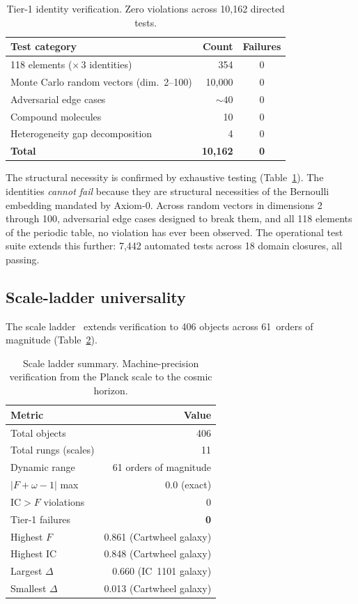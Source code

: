 \documentclass[
  aps,
  prd,
  twocolumn,
  superscriptaddress,
  nofootinbib,
  floatfix
]{revtex4-2}
\newcommand{\IC}{\mathrm{IC}}
\begin{document}
\begin{table}[t]
\caption{\label{tab:tier1-tests}Tier-1 identity verification.
Zero violations across 10{,}162 directed tests.}
\begin{ruledtabular}
\begin{tabular}{lrc}
Test category & Count & Failures \\
\midrule
118 elements ($\times\,3$ identities) & 354 & 0 \\
Monte Carlo random vectors (dim.\ 2--100) & 10{,}000 & 0 \\
Adversarial edge cases & $\sim\!40$ & 0 \\
Compound molecules & 10 & 0 \\
Heterogeneity gap decomposition & 4 & 0 \\
\midrule
\textbf{Total} & \textbf{10{,}162} & \textbf{0}
\end{tabular}
\end{ruledtabular}
\end{table}

The structural necessity is confirmed by exhaustive testing
(Table~\ref{tab:tier1-tests}).  The identities \emph{cannot fail}
because they are structural necessities of the Bernoulli embedding
mandated by Axiom-0.  Across random vectors in dimensions 2 through
100, adversarial edge cases designed to break them, and all 118
elements of the periodic table, no violation has ever been observed.
The operational test suite extends this further: 7{,}442 automated
tests across 18 domain closures, all passing.

\subsection{Scale-ladder universality}

The scale ladder~\cite{umcpmetadatarepo} extends verification to
406 objects across 61~orders of magnitude
(Table~\ref{tab:scale-ladder}).

\begin{table}[t]
\caption{\label{tab:scale-ladder}Scale ladder summary.
Machine-precision verification from the Planck scale to the cosmic
horizon.}
\begin{ruledtabular}
\begin{tabular}{lr}
Metric & Value \\
\midrule
Total objects & 406 \\
Total rungs (scales) & 11 \\
Dynamic range & 61 orders of magnitude \\
$|F + \omega - 1|$ max & $0.0$ (exact) \\
$\IC > F$ violations & 0 \\
Tier-1 failures & \textbf{0} \\
Highest $F$ & 0.861 (Cartwheel galaxy) \\
Highest $\IC$ & 0.848 (Cartwheel galaxy) \\
Largest $\Delta$ & 0.660 (IC~1101 galaxy) \\
Smallest $\Delta$ & 0.013 (Cartwheel galaxy) \\
\end{tabular}
\end{ruledtabular}
\end{table}
\end{document}
